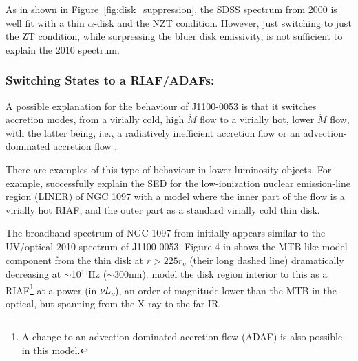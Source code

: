 \documentclass[a4paper,fleqn,usenatbib]{mnras}
\begin{document}
As in shown in Figure~\ref{fig:disk_suppression}, the SDSS spectrum
from 2000 is well fit with a thin \citet{SS73} $\alpha$-disk and the
NZT condition.  However, just switching to just the ZT condition,
while surpressing the bluer disk emissivity, is not sufficient to
explain the 2010 spectrum.

\subsubsection{Switching States to a RIAF/ADAFs:}
A possible explanation for the behaviour of J1100-0053 is that it
switches accretion modes, from a virially cold, high $\dot{M}$ flow to a
virially hot, lower $\dot{M}$ flow, with the latter being, i.e., a
radiatively inefficient accretion flow \citep[RIAF; ][]{Narayan1998,
Quataert2001} or an advection-dominated accretion flow \citep[ADAF;
][and references therein]{YuanNarayan2014}.

There are examples of this type of behaviour in lower-luminosity
objects.  For example, \citet{Nemmen2006} successfully explain the SED
for the low-ionization nuclear emission-line region (LINER) of NGC
1097 with a model where the inner part of the flow is a virially hot
RIAF, and the outer part as a standard virially cold thin disk.

The broadband spectrum of NGC 1097 from \citet{Nemmen2006} initially
appears similar to the UV/optical 2010 spectrum of J1100-0053.  Figure
4 in \citet{Nemmen2006} shows the MTB-like model component from the
thin disk at $r>225r_{g}$ (their long dashed line) dramatically
decreasing at $\sim$10$^{15}$Hz ($\sim$300nm). \citet{Nemmen2006}
model the disk region interior to this as a RIAF\footnote{A change to
an advection-dominated accretion flow (ADAF) is also possible in this
model.} at a power (in $\nu L_{\nu}$), an order of magnitude lower
than the MTB in the optical, but spanning from the X-ray to the
far-IR.
\end{document}
